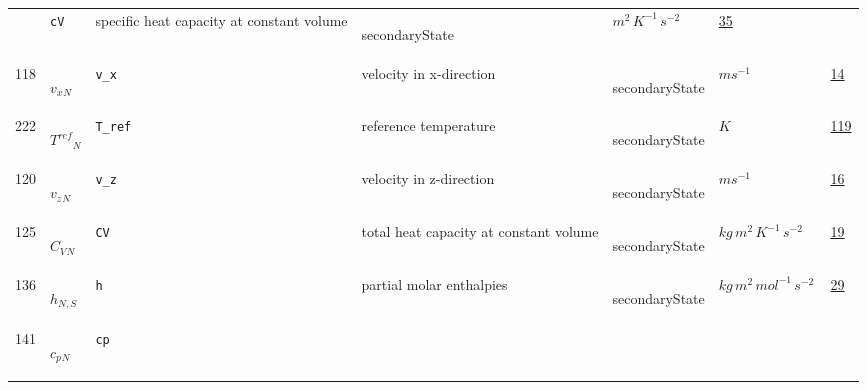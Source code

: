 \begin{longtable}{|p{1cm}|p{2.5cm}|p{4.5cm}|p{8cm}|p{3.0cm}|p{3cm}|p{1cm}|}
             & \verb|cV|
             & specific heat capacity at constant volume
             & \begin{lay}secondaryState \end{lay}
             & $ m^{2} \,K^{-1} \,s^{-2} \, $
             &                 \hyperlink{"e:35"}{ 35 }
                 \\
            118
             & \hypertarget{"v:118"}{ $ {{v_x}}{_{N}} $}
             & \verb|v_x|
             & velocity in x-direction
             & \begin{lay}secondaryState \end{lay}
             & $ m s^{-1} \, $
             &                 \hyperlink{"e:14"}{ 14 }
                 \\
            222
             & \hypertarget{"v:222"}{ $ {{T^{ref}}}{_{N}} $}
             & \verb|T_ref|
             & reference temperature
             & \begin{lay}secondaryState \end{lay}
             & $ K \, $
             &                 \hyperlink{"e:119"}{ 119 }
                 \\
            120
             & \hypertarget{"v:120"}{ $ {{v_z}}{_{N}} $}
             & \verb|v_z|
             & velocity in z-direction
             & \begin{lay}secondaryState \end{lay}
             & $ m s^{-1} \, $
             &                 \hyperlink{"e:16"}{ 16 }
                 \\
            125
             & \hypertarget{"v:125"}{ $ {{C_V}}{_{N}} $}
             & \verb|CV|
             & total heat capacity at constant volume
             & \begin{lay}secondaryState \end{lay}
             & $ kg \,m^{2} \,K^{-1} \,s^{-2} \, $
             &                 \hyperlink{"e:19"}{ 19 }
                 \\
            136
             & \hypertarget{"v:136"}{ $ {h}{_{N, S}} $}
             & \verb|h|
             & partial molar enthalpies
             & \begin{lay}secondaryState \end{lay}
             & $ kg \,m^{2} \,mol^{-1} \,s^{-2} \, $
             &                 \hyperlink{"e:29"}{ 29 }
                 \\
            141
             & \hypertarget{"v:141"}{ $ {{c_p}}{_{N}} $}
             & \verb|cp|

\end{longtable}

